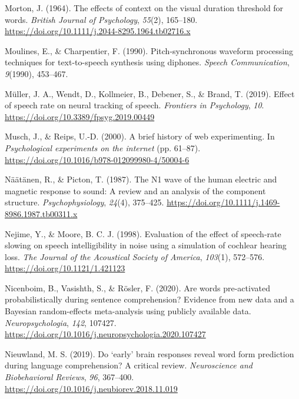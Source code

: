 \documentclass[a4paper, nobind]{templates/ociamthesis}
\newlength{\cslhangindent}
\newenvironment{CSLReferences}[2] %
 {%
  \setlength{\parindent}{0pt}
  \ifodd #1
  \let\oldpar\par
  \def\par{\hangindent=\cslhangindent\oldpar}
  \fi
  \setlength{\parskip}{1mm}
  \setlength{\baselineskip}{6mm}
 }%
 {}
\begin{document}
\begin{CSLReferences}{1}{0}
\leavevmode{}%
Morton, J. (1964). {The effects of context on the visual duration threshold for words}. \emph{British Journal of Psychology}, \emph{55}(2), 165--180. \url{https://doi.org/10.1111/j.2044-8295.1964.tb02716.x}

\leavevmode{}%
Moulines, E., \& Charpentier, F. (1990). {Pitch-synchronous waveform processing techniques for text-to-speech synthesis using diphones}. \emph{Speech Communication}, \emph{9}(1990), 453--467.

\leavevmode{}%
Müller, J. A., Wendt, D., Kollmeier, B., Debener, S., \& Brand, T. (2019). {Effect of speech rate on neural tracking of speech}. \emph{Frontiers in Psychology}, \emph{10}. \url{https://doi.org/10.3389/fpsyg.2019.00449}

\leavevmode{}%
Musch, J., \& Reips, U.-D. (2000). {A brief history of web experimenting}. In \emph{Psychological experiments on the internet} (pp. 61--87). \url{https://doi.org/10.1016/b978-012099980-4/50004-6}

\leavevmode{}%
Näätänen, R., \& Picton, T. (1987). {The N1 wave of the human electric and magnetic response to sound: A review and an analysis of the component structure}. \emph{Psychophysiology}, \emph{24}(4), 375--425. \url{https://doi.org/10.1111/j.1469-8986.1987.tb00311.x}

\leavevmode{}%
Nejime, Y., \& Moore, B. C. J. (1998). {Evaluation of the effect of speech-rate slowing on speech intelligibility in noise using a simulation of cochlear hearing loss}. \emph{The Journal of the Acoustical Society of America}, \emph{103}(1), 572--576. \url{https://doi.org/10.1121/1.421123}

\leavevmode{}%
Nicenboim, B., Vasishth, S., \& Rösler, F. (2020). Are words pre-activated probabilistically during sentence comprehension? Evidence from new data and a Bayesian random-effects meta-analysis using publicly available data. \emph{Neuropsychologia}, \emph{142}, 107427. \url{https://doi.org/10.1016/j.neuropsychologia.2020.107427}

\leavevmode{}%
Nieuwland, M. S. (2019). {Do `early' brain responses reveal word form prediction during language comprehension? A critical review}. \emph{Neuroscience and Biobehavioral Reviews}, \emph{96}, 367--400. \url{https://doi.org/10.1016/j.neubiorev.2018.11.019}


\end{CSLReferences}
\end{document}

